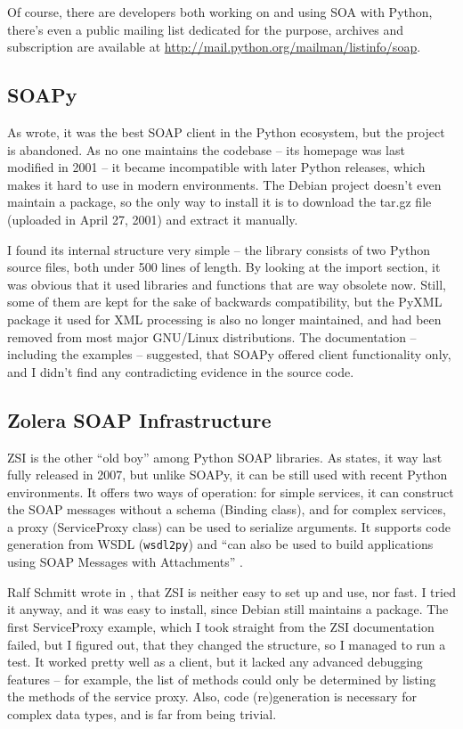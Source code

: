 Of course, there are developers both working on and using SOA with Python, there's even a public mailing list dedicated for the purpose, archives and subscription are available at \url{http://mail.python.org/mailman/listinfo/soap}.

\subsection{SOAPy}

As \cite{so-206154} wrote, it was the best SOAP client in the Python ecosystem, but the project is abandoned. As no one maintains the codebase -- its homepage was last modified in 2001 -- it became incompatible with later Python releases, which makes it hard to use in modern environments. The Debian project doesn't even maintain a package, so the only way to install it is to download the tar.gz file (uploaded in April 27, 2001) and extract it manually.

I found its internal structure very simple -- the library consists of two Python source files, both under 500 lines of length. By looking at the import section, it was obvious that it used libraries and functions that are way obsolete now. Still, some of them are kept for the sake of backwards compatibility, but the PyXML package it used for XML processing is also no longer maintained, and had been removed from most major GNU/Linux distributions. The documentation -- including the examples -- suggested, that SOAPy offered client functionality only, and I didn't find any contradicting evidence in the source code.

\subsection{Zolera SOAP Infrastructure}
\label{ZSI}

ZSI is the other ``old boy'' among Python SOAP libraries. As \cite{pywebsvcs-talk} states, it way last fully released in 2007, but unlike SOAPy, it can be still used with recent Python environments. It offers two ways of operation: for simple services, it can construct the SOAP messages without a schema (Binding class), and for complex services, a proxy (ServiceProxy class) can be used to serialize arguments. It supports code generation from WSDL (\verb|wsdl2py|) and ``can also be used to build applications using SOAP Messages with Attachments'' \cite{zsi-doc}.

Ralf Schmitt wrote in \cite{zsi-velocity}, that ZSI is neither easy to set up and use, nor fast. I tried it anyway, and it was easy to install, since Debian still maintains a package. The first ServiceProxy example, which I took straight from the ZSI documentation failed, but I figured out, that they changed the structure, so I managed to run a test. It worked pretty well as a client, but it lacked any advanced debugging features -- for example, the list of methods could only be determined by listing the methods of the service proxy. Also, code (re)generation is necessary for complex data types, and is far from being trivial.

